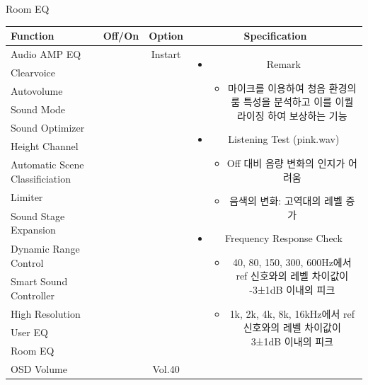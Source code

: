 \documentclass{beamer}
\begin{document}
\begin{frame}[t]{Room EQ}
\begin{tiny}
\begin{tabular}{@{}lccc@{}}
\toprule
Function & Off/On & Option & Specification \\
\midrule
Audio AMP EQ & \color{black}{Off} & Instart &
\multirow{14}{60mm}{
\begin{itemize}
\item Remark
	\begin{itemize}
	\item 마이크를 이용하여 청음 환경의 룸 특성을 분석하고 이를 이퀄라이징 하여 보상하는 기능
	\end{itemize}
\item Listening Test (pink.wav)
	\begin{itemize}
	\item Off 대비 음량 변화의 인지가 어려움
	\item 음색의 변화: 고역대의 레벨 증가
	\end{itemize}
\item Frequency Response Check
  \begin{itemize}
  \item 40, 80, 150, 300, 600Hz에서 ref 신호와의 레벨 차이값이 -3±1dB 이내의 피크
  \item 1k, 2k, 4k, 8k, 16kHz에서 ref 신호와의 레벨 차이값이 3±1dB 이내의 피크
  \end{itemize}
\end{itemize}
} \\
Clearvoice & \color{black}{Off} & & \\
Autovolume & \color{black}{Off} & & \\
Sound Mode & \color{black}{Off} & & \\
Sound Optimizer & \color{black}{Off} & & \\
Height Channel & \color{black}{Off} & & \\
Automatic Scene Classificiation & \color{black}{Off} & & \\
Limiter & \color{black}{Off} & & \\
Sound Stage Expansion & \color{black}{Off} & & \\
Dynamic Range Control & \color{black}{Off} & & \\
Smart Sound Controller & \color{black}{Off} & & \\
High Resolution & \color{black}{Off} & & \\
User EQ & \color{black}{Off} & & \\
Room EQ & \color{blue}{On} & & \\
OSD Volume & \color{blue}{On} & Vol.40 & \\
\midrule
\end{tabular}
\end{tiny}


\end{frame}
\end{document}
